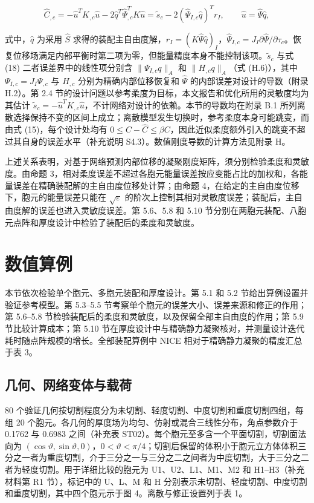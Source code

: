 \documentclass[preprint,12pt,authoryear]{elsarticle}
\begin{document}
\[
\widehat C_{,c}
=-\widehat u^TK_{,c}\widehat u
 -2\widehat q^T\widehat\Psi_{,c}^TK\widehat u
=\widetilde s_c-2(\widehat\Psi_{I,c}\widehat q)^Tr_I,
\qquad\widehat u=\widehat\Psi\widehat q,
\tag{18}
\]

式中，\(\widehat q\) 为采用 \(\widehat S\) 求得的装配主自由度解，\(r_I=(K\widehat\Psi\widehat q)_I\)，\(\widehat\Psi_{I,c}=J_I\partial \widehat\Psi/\partial\tau_c\)。恢复位移场满足内部平衡时第二项为零，但能量精度本身不能控制该项。\(\widetilde s_c\) 与式 (18) 二者误差界中的线性项分别含 \(\|\Psi_{I,c}q\|_A\) 和 \(\|H_{,c}q\|_A\)（式 (H.6)），其中 \(\Psi_{I,c}=J_I\Psi_{,c}\) 与 \(H_{,c}\) 分别为精确内部位移恢复和 \(\widehat\Psi\) 的内部误差对设计的导数（附录 H.2）。第 2.4 节的设计问题以参考柔度为目标，本文报告和优化所用的灵敏度均为其估计 \(\widetilde s_c=-\widehat u^TK_{,c}\widehat u\)，不计网络对设计的依赖。本节的导数均在附录 B.1 所列离散选择保持不变的区间上成立；离散模型发生切换时，参考柔度本身可能跳变，而由式 (15)，每个设计处均有 \(0\le C-\widehat C\le\beta C\)，因此近似柔度额外引入的跳变不超过其自身的误差水平（补充说明 S4.3）。数值刚度导数的计算方法见附录 H。

上述关系表明，对基于网络预测内部位移的凝聚刚度矩阵，须分别检验柔度和灵敏度。由命题 3，相对柔度误差不超过各胞元能量误差按应变能占比的加权和，各能量误差在精确装配解的主自由度位移处计算；由命题 4，在给定的主自由度位移下，胞元的能量误差只能在 \(\sqrt\varepsilon\) 的阶次上控制其相对灵敏度误差；装配后，主自由度解的误差也进入灵敏度误差。第 5.6、5.8 和 5.10 节分别在两胞元装配、八胞元点阵和厚度设计中检验了装配后的柔度和灵敏度。

\section{数值算例}

本节依次检验单个胞元、多胞元装配和厚度设计。第 5.1 和 5.2 节给出算例设置并验证参考模型。第 5.3--5.5 节考察单个胞元的误差大小、误差来源和修正的作用；第 5.6--5.8 节检验装配后的柔度和灵敏度，以及保留全部主自由度的作用；第 5.9 节比较计算成本；第 5.10 节在厚度设计中与精确静力凝聚核对，并测量设计迭代耗时随点阵规模的增长。全部装配算例中 NICE 相对于精确静力凝聚的精度汇总于表 3。

\subsection{几何、网络变体与载荷}

80 个验证几何按切割程度分为未切割、轻度切割、中度切割和重度切割四组，每组 20 个胞元。各几何的厚度场为均匀、仿射或混合三线性分布，角点参数介于 0.1762 与 0.6983 之间（补充表 ST02）。每个胞元至多含一个平面切割，切割面法向为 \((\cos\vartheta,\sin\vartheta,0)\)，\(0<\vartheta<\pi/4\)；切割后保留的体积小于胞元立方体体积三分之一者为重度切割，介于三分之一与三分之二之间者为中度切割，大于三分之二者为轻度切割。用于详细比较的胞元为 U1、U2、L1、M1、M2 和 H1--H3（补充材料第 R1 节），标记中的 U、L、M 和 H 分别表示未切割、轻度切割、中度切割和重度切割，其中四个胞元示于图 4。离散与修正设置列于表 1。
\end{document}
